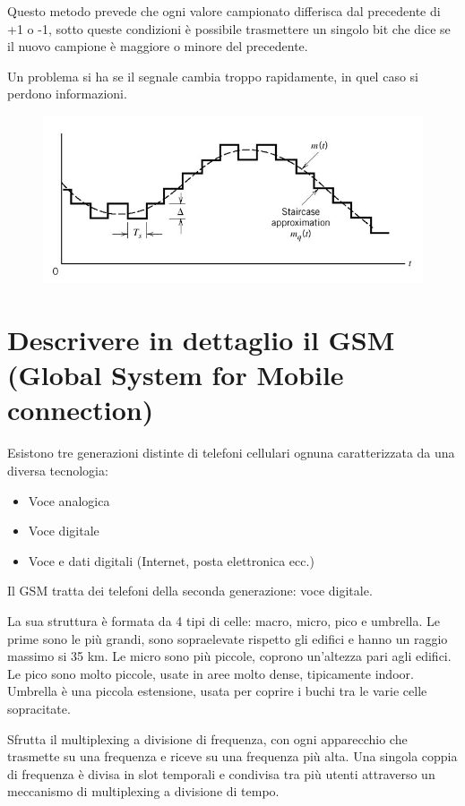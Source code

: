 Questo metodo prevede che ogni valore campionato differisca dal precedente di +1 o -1, sotto queste condizioni è possibile trasmettere un singolo bit che dice se il nuovo campione è maggiore o minore del precedente.

Un problema si ha se il segnale cambia troppo rapidamente, in quel caso si perdono informazioni.

\begin{figure}[H]
\centering
\includegraphics[scale=0.6]{res/img/6_modulazioneDelta.png}
\end{figure}
 
\section{Descrivere in dettaglio il GSM (Global System for Mobile connection)}
Esistono tre generazioni distinte di telefoni cellulari ognuna caratterizzata da una diversa tecnologia:
\begin{itemize}
\item	Voce analogica
\item	Voce digitale
\item	Voce e dati digitali (Internet, posta elettronica ecc.)
\end{itemize}
Il GSM tratta dei telefoni della seconda generazione: voce digitale.

La sua struttura è formata da 4 tipi di celle: macro, micro, pico e umbrella. 
Le prime sono le più grandi, sono sopraelevate rispetto gli edifici e hanno un raggio massimo si 35 km. Le micro sono più piccole, coprono un'altezza pari agli edifici. Le pico sono molto piccole, usate in aree molto dense, tipicamente indoor. Umbrella è una piccola estensione, usata per coprire i buchi tra le varie celle sopracitate.

Sfrutta il multiplexing a divisione di frequenza, con ogni apparecchio che trasmette su una frequenza e riceve su una frequenza più alta. Una singola coppia di frequenza è divisa in slot temporali e condivisa tra più utenti attraverso un meccanismo di multiplexing a divisione di tempo.


